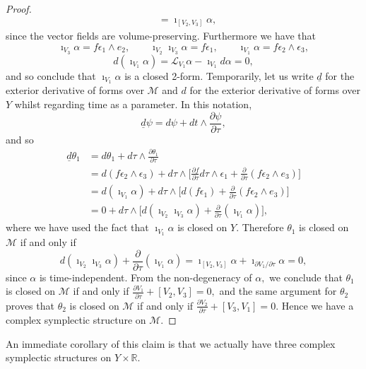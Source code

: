 \documentclass[a4paper,onecolumn,12pt]{article}
\theoremstyle{definition}
\theoremstyle{remark}
\newcommand{\e}{\epsilon}
\newcommand{\dd}[2]{\frac{\partial #1}{\partial #2}}
\newcommand{\R}{\mathbb{R}}
\begin{document}
\begin{proof}
\begin{align*}
	&= \imath_{[V_{2},V_{3}]}\alpha,
	\end{align*}
	since the vector fields are volume-preserving. Furthermore we have that 
	\begin{equation*}
	\imath_{V_{3}}\alpha = f\e_{1}\wedge e_{2},\qquad \imath_{V_{2}}\imath_{V_{3}}\alpha = f\e_{1},\qquad \imath_{V_{1}}\alpha=f\e_{2}\wedge\e_{3},
	\end{equation*}
	\begin{equation*}
	d(\imath_{V_{1}}\alpha) = \mathcal{L}_{V_{1}}\alpha - \imath_{V_{1}}d\alpha = 0,
	\end{equation*}
	and so conclude that $\imath_{V_{1}}\alpha$ is a closed 2-form. Temporarily, let us write $\underline{d}$ for the exterior derivative of forms over $\mathcal{M}$ and $d$ for the exterior derivative of forms over $Y$ whilst regarding time as a parameter. In this notation,
	\begin{equation*}
	\underline{d}\psi = d\psi + dt\wedge\dd{\psi}{\tau},
	\end{equation*}
	and so
	\begin{align*}
	\underline{d}\theta_{1} &= d\theta_{1} + d\tau \wedge \dd{\theta_{1}}{\tau}\\
	&= d(f\e_{2}\wedge\e_{3}) + d\tau\wedge \Bigg[\dd{f}{\tau} d\tau\wedge\e_{1} + \dd{}{\tau}(f \e_{2} \wedge e_{3})\Bigg]\\
	&= d(\imath_{V_{1}}\alpha) + d\tau\wedge \Bigg[d(f\e_{1}) + \dd{}{\tau}(f \e_{2} \wedge e_{3})\Bigg]\\
	&= 0 + d\tau\wedge \Bigg[d(\imath_{V_{2}}\imath_{V_{3}}\alpha) + \dd{}{\tau}(\imath_{V_{1}}\alpha)\Bigg],
	\end{align*}
	where we have used the fact that $\imath_{V_{1}}\alpha$ is closed on $Y.$ Therefore $\theta_{1}$ is closed on $\mathcal{M}$ if and only if
	\begin{equation*}
	d(\imath_{V_{2}}\imath_{V_{3}}\alpha) + \dd{}{\tau}(\imath_{V_{1}}\alpha)
	= \imath_{[V_{2},V_{3}]}\alpha + \imath_{\partial V_{1}/\partial\tau}\alpha
	= 0,
	\end{equation*}
	since $\alpha$ is time-independent. From the non-degeneracy of $\alpha,$ we conclude that $\theta_{1}$ is closed on $\mathcal{M}$ if and only if $\dd{V_{1}}{\tau} + [V_{2},V_{3}] = 0,$ and the same argument for $\theta_{2}$ proves that $\theta_{2}$ is closed on $\mathcal{M}$ if and only if $\dd{V_{2}}{\tau} + [V_{3},V_{1}] = 0.$ Hence we have a complex symplectic structure on $\mathcal{M}.$
\end{proof}
An immediate corollary of this claim is that we actually have three complex symplectic structures on $Y\times\R.$\\
\end{document}
